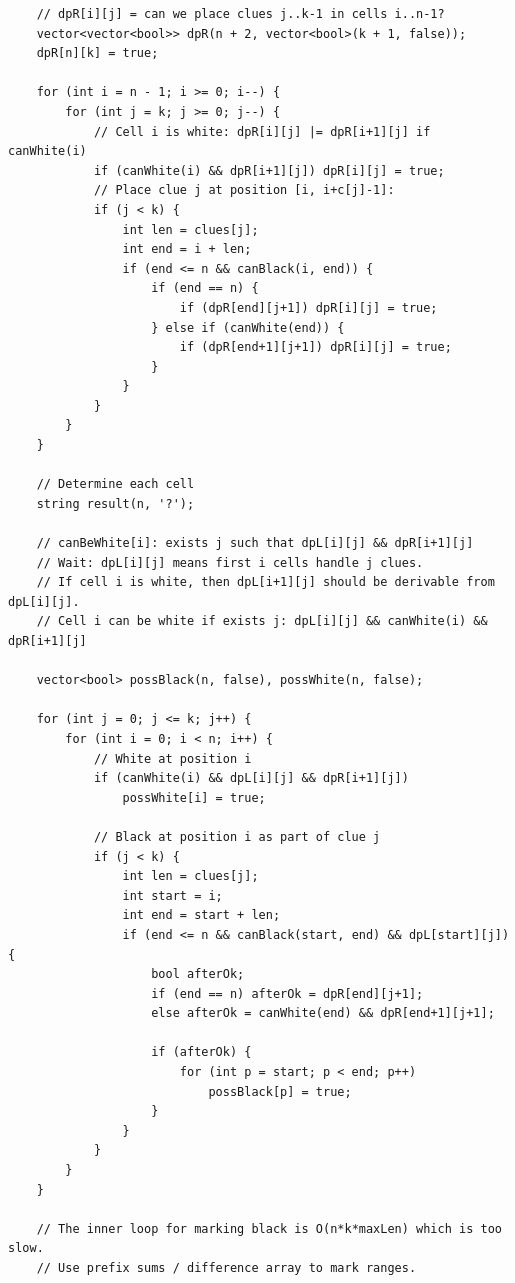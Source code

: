 \documentclass[11pt,a4paper]{article}
\begin{document}
\begin{lstlisting}
    // dpR[i][j] = can we place clues j..k-1 in cells i..n-1?
    vector<vector<bool>> dpR(n + 2, vector<bool>(k + 1, false));
    dpR[n][k] = true;

    for (int i = n - 1; i >= 0; i--) {
        for (int j = k; j >= 0; j--) {
            // Cell i is white: dpR[i][j] |= dpR[i+1][j] if canWhite(i)
            if (canWhite(i) && dpR[i+1][j]) dpR[i][j] = true;
            // Place clue j at position [i, i+c[j]-1]:
            if (j < k) {
                int len = clues[j];
                int end = i + len;
                if (end <= n && canBlack(i, end)) {
                    if (end == n) {
                        if (dpR[end][j+1]) dpR[i][j] = true;
                    } else if (canWhite(end)) {
                        if (dpR[end+1][j+1]) dpR[i][j] = true;
                    }
                }
            }
        }
    }

    // Determine each cell
    string result(n, '?');

    // canBeWhite[i]: exists j such that dpL[i][j] && dpR[i+1][j]
    // Wait: dpL[i][j] means first i cells handle j clues.
    // If cell i is white, then dpL[i+1][j] should be derivable from dpL[i][j].
    // Cell i can be white if exists j: dpL[i][j] && canWhite(i) && dpR[i+1][j]

    vector<bool> possBlack(n, false), possWhite(n, false);

    for (int j = 0; j <= k; j++) {
        for (int i = 0; i < n; i++) {
            // White at position i
            if (canWhite(i) && dpL[i][j] && dpR[i+1][j])
                possWhite[i] = true;

            // Black at position i as part of clue j
            if (j < k) {
                int len = clues[j];
                int start = i;
                int end = start + len;
                if (end <= n && canBlack(start, end) && dpL[start][j]) {
                    bool afterOk;
                    if (end == n) afterOk = dpR[end][j+1];
                    else afterOk = canWhite(end) && dpR[end+1][j+1];

                    if (afterOk) {
                        for (int p = start; p < end; p++)
                            possBlack[p] = true;
                    }
                }
            }
        }
    }

    // The inner loop for marking black is O(n*k*maxLen) which is too slow.
    // Use prefix sums / difference array to mark ranges.


\end{lstlisting}
\end{document}

